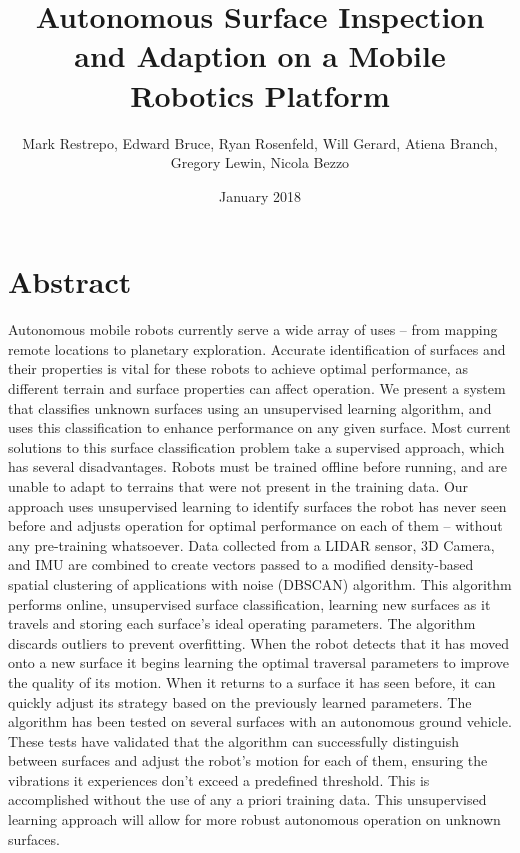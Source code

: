 \documentclass{article}
\title{Autonomous Surface Inspection and Adaption on a Mobile Robotics Platform}
\author{Mark Restrepo, Edward Bruce, Ryan Rosenfeld, Will Gerard, Atiena Branch, Gregory Lewin, Nicola Bezzo}
\date{January 2018}
\begin{document}
\section{Abstract}



Autonomous mobile robots  currently serve a wide array of uses -- from mapping remote locations to planetary exploration. Accurate identification of surfaces and their properties is vital for these robots to achieve optimal performance, as different terrain and surface properties can affect operation. We present a system that classifies unknown surfaces using an unsupervised learning algorithm, and uses this classification to enhance performance on any given surface. Most current solutions to this surface classification problem take a supervised approach, which has several disadvantages. Robots must be trained offline before running, and are unable to adapt to terrains that were not present in the training data. Our approach uses unsupervised learning to identify surfaces the robot has never seen before and adjusts operation for optimal performance on each of them -- without any pre-training whatsoever. Data collected from a LIDAR sensor, 3D Camera, and IMU are combined to create vectors passed to a modified density-based spatial clustering of applications with noise (DBSCAN) algorithm. This algorithm performs online, unsupervised surface classification, learning new surfaces as it travels and storing each surface's ideal operating parameters. The algorithm discards outliers to prevent overfitting. When the robot detects that it has moved onto a new surface it begins learning the optimal traversal parameters to improve the quality of its motion. When it returns to a surface it has seen before, it can quickly adjust its strategy based on the previously learned parameters. The algorithm has been tested on several surfaces with an autonomous ground vehicle. These tests have validated that the algorithm can successfully distinguish between surfaces and adjust the robot's motion for each of them, ensuring the vibrations it experiences don't exceed a predefined threshold. This is accomplished without the use of any a priori training data. This unsupervised learning approach will allow for more robust autonomous operation on unknown surfaces. 
\end{document}
